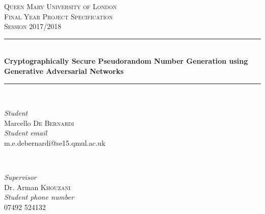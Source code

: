 \documentclass[12pt, titlepage]{article}
\begin{document}
\begin{titlepage} %
	\newcommand{\HRule}{\rule{\linewidth}{0.5mm}} %

	\center %


	\textsc{\LARGE Queen Mary University of London}\\[1.5cm] %
	\textsc{\Large Final Year Project Specification}\\[0.5cm] %
	\textsc{\large Session 2017/2018}\\[0.5cm] %


	\HRule\\[0.4cm]

	{\huge\bfseries Cryptographically Secure Pseudorandom Number Generation using
  Generative Adversarial Networks}\\[0cm] %

	\HRule\\[1.5cm]


	\begin{minipage}{0.4\textwidth}
		\begin{flushleft}
			\large
			\textit{Student}\\
			Marcello \textsc{De Bernardi}\\[0.4cm] %
      \textit{Student email}\\
      m.e.debernardi@se15.qmul.ac.uk
		\end{flushleft}
	\end{minipage}
	~
	\begin{minipage}{0.4\textwidth}
		\begin{flushright}
			\large
			\textit{Supervisor}\\
			Dr. Arman \textsc{Khouzani}\\[0.4cm] %
      \textit{Student phone number}\\
      07492 524132
		\end{flushright}
	\end{minipage}
  ~


\end{titlepage}
\end{document}
